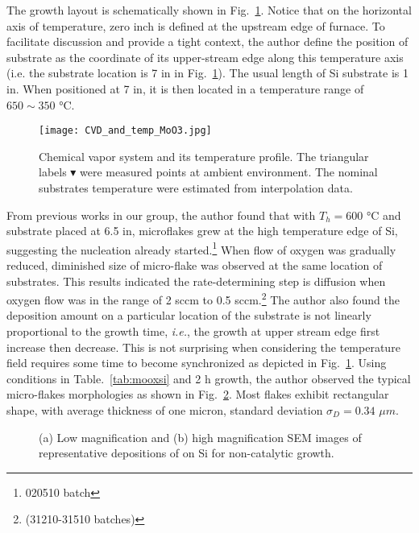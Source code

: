 The growth layout is schematically shown in Fig.~\ref{fig:mooxgrowth}. Notice that on the horizontal axis of temperature, zero inch is defined at the upstream edge of furnace. To facilitate discussion and provide a tight context, the author define the position of substrate as the coordinate of its upper-stream edge along this temperature axis (i.e. the substrate location is 7 in in Fig.~\ref{fig:mooxgrowth}). The usual length of Si substrate is 1 in. When positioned at 7 in, it is then located in a temperature range of $650 \sim 350$ \si{\degreeCelsius}.
\begin{figure}[htb]
\centering
\texttt{[image: CVD\_and\_temp\_MoO3.jpg]}
\caption[Growth setup of ]{Chemical vapor system and its temperature profile. The triangular labels $\blacktriangledown$ were measured points at ambient environment. The nominal substrates temperature were estimated from interpolation data.}
\label{fig:mooxgrowth}
\end{figure}

From previous works in our group,\cite{predeep2011} the author found that with $T_h = 600$ \si{\degreeCelsius} and substrate placed at 6.5 in, microflakes grew at the high temperature edge of Si, suggesting the nucleation already started.\footnote{020510 batch} When flow of oxygen was gradually reduced, diminished size of micro-flake was observed at the same location of substrates. This results indicated the rate-determining step is diffusion when oxygen flow was in the range of 2 sccm to 0.5 sccm.\footnote{(31210-31510 batches)} The author also found the deposition amount on a particular location of the substrate is not linearly proportional to the growth time, \emph{i.e.}, the growth at upper stream edge first increase then decrease. This is not surprising when considering the temperature field requires some time to become synchronized as depicted in Fig.~\ref{fig:mooxgrowth}. Using conditions in Table.~\ref{tab:mooxsi} and 2 h growth, the author observed the typical micro-flakes morphologies as shown in Fig.~\ref{fig:mosisem}. Most flakes exhibit rectangular shape, with average thickness of one micron, standard deviation $\sigma_D=0.34$  $\mu m$.
\begin{figure}[htb]
\centering
{}\hspace{0.04\textwidth}
\caption[Representative morphologies of  on Si]{(a) Low magnification and (b) high magnification SEM images of representative depositions of  on Si for non-catalytic growth.}
\label{fig:mosisem}
\end{figure}

